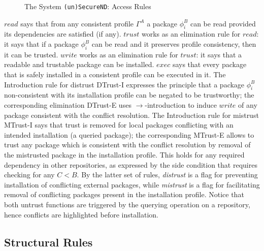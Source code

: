 \documentclass[]{llncs}
\begin{document}
\begin{figure*}[t]
	\begin{prooftree}
	\end{prooftree}
	\caption{The System \texttt{(un)SecureND}: Access Rules}\label{fig:system2}
\end{figure*}

%



$\mathit{read}$ says that from any consistent profile $\Gamma^{A}$ a package $\phi^{B}_{i}$ can be read provided its dependencies are satisfied (if any).
$\mathit{trust}$ works as an elimination rule for $read$: it says that if a package $\phi^{B}_{i}$ can be read and it preserves profile consistency, then it can be trusted. $\mathit{write}$ works as an elimination rule for $trust$: it says that a readable and trustable package can be installed. $\mathit{exec}$ says that every package that is safely installed in a consistent profile can be executed in it. The Introduction rule for distrust DTrust-I expresses the principle that a package $\phi^{B}_{i}$ non-consistent with its installation profile can be negated to be trustworthy; the corresponding elimination DTrust-E uses $\rightarrow$-introduction to induce $write$ of any package consistent with the conflict resolution. The Introduction rule for mistrust MTrust-I says that trust is removed for local packages conflicting with an intended installation (a queried package); the corresponding MTrust-E allows to trust any package which is consistent with the conflict resolution by removal of the mistrusted package in the installation profile. This holds for any required dependency in other repositories, as expressed by the side condition that requires checking for any $C<B$. By the latter set of rules, \textit{distrust} is a flag for preventing installation of conflicting external packages, while \textit{mistrust} is a flag for facilitating removal of conflicting packages present in the installation profile. Notice that both untrust functions are triggered by the querying operation on a repository, hence conflicts are highlighted before installation.


\subsection{Structural Rules}
\end{document}
